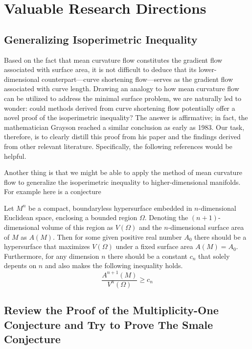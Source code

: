 \section{Valuable Research Directions}

\subsection{Generalizing Isoperimetric Inequality}

Based on the fact that mean curvature flow constitutes the gradient flow associated with surface area, it is not difficult to deduce that its lower-dimensional counterpart—curve shortening flow—serves as the gradient flow associated with curve length. Drawing an analogy to how mean curvature flow can be utilized to address the minimal surface problem, we are naturally led to wonder: could methods derived from curve shortening flow potentially offer a novel proof of the isoperimetric inequality? The answer is affirmative; in fact, the mathematician Grayson reached a similar conclusion as early as 1983\cite{gage1983isoperimetric}. Our task, therefore, is to clearly distill this proof from his paper and the findings derived from other relevant literature. Specifically, the following references would be helpful\cite{grayson1989shortening,gage1984curve,gage1986heat,grayson1987heat}.

Another thing is that we might be able to apply the method of mean curvature flow to generalize the isoperimetric inequality to higher-dimensional manifolds. For example here is a conjecture
\begin{conjecture}\label{conj:4-1-1}
    Let $M^n$ be a compact, boundaryless hypersurface embedded in $n$-dimensional Euclidean space, enclosing a bounded region $\Omega$. Denoting the $(n+1)$-dimensional volume of this region as $V(\Omega)$ and the $n$-dimensional surface area of $M$ as $A(M)$. Then for some given positive real number $A_0$ there should be a hypersurface that maximizes $V(\Omega)$ under a fixed surface area $A(M)=A_0$.
    Furthermore, for any dimension $n$ there should be a constant $c_n$ that solely depents on $n$ and also makes the following inequality holds.
    \begin{equation}
        \frac{A^{n+1}(M)}{V^n(\Omega)} \ge c_n
    \end{equation}
\end{conjecture}

\subsection{Review the Proof of the Multiplicity-One Conjecture and Try to Prove The Smale Conjecture}